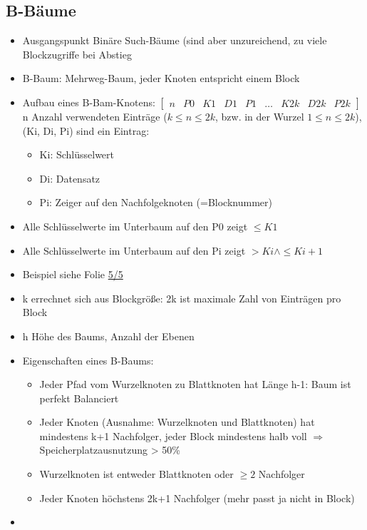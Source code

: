 \documentclass[a4paper, 12pt]{scrartcl}
\begin{document}
\subsection{B-Bäume}
\begin{itemize}
	\item
		Ausgangspunkt Binäre Such-Bäume (sind aber unzureichend, zu viele Blockzugriffe bei Abstieg
	\item
		B-Baum: Mehrweg-Baum, jeder Knoten entspricht einem Block
	\item
	Aufbau eines B-Bam-Knotens: $\begin{bmatrix}n & P0 & K1 & D1 & P1 & \dots & K2k&D2k &P2k \end{bmatrix}$\\
		n Anzahl verwendeten Einträge ($k\leq n \leq 2k$, bzw. in der Wurzel $1 \leq n \leq 2k$), (Ki, Di, Pi) sind ein Eintrag:
		\begin{itemize}
			\item Ki: Schlüsselwert
			\item Di: Datensatz
			\item Pi: Zeiger auf den Nachfolgeknoten (=Blocknummer)
		\end{itemize}
	\item
		Alle Schlüsselwerte im Unterbaum auf den P0  zeigt $\leq K1$
	\item
		Alle Schlüsselwerte im Unterbaum auf den Pi zeigt $> Ki \wedge \leq Ki+1$
	\item
		Beispiel siehe Folie \href{run:IDB-2015WS-05-Schluessel-Teil-2.pdf}{5/5}
	\item
		k errechnet sich aus Blockgröße: 2k ist maximale Zahl von Einträgen pro Block
	\item
		h Höhe des Baums, Anzahl der Ebenen
	\item
		Eigenschaften eines B-Baums:
		\begin{itemize}
			\item
				Jeder Pfad vom Wurzelknoten zu Blattknoten hat Länge h-1: Baum ist perfekt Balanciert
			\item
				Jeder Knoten (Ausnahme: Wurzelknoten und Blattknoten) hat mindestens k+1 Nachfolger, jeder Block mindestens halb voll $\Rightarrow$ Speicherplatzausnutzung > 50\%
			\item
				Wurzelknoten ist entweder Blattknoten oder $\geq 2$ Nachfolger
			\item
				Jeder Knoten höchstens 2k+1 Nachfolger (mehr passt ja nicht in Block)
		\end{itemize}
	\item

\end{itemize}
\end{document}
